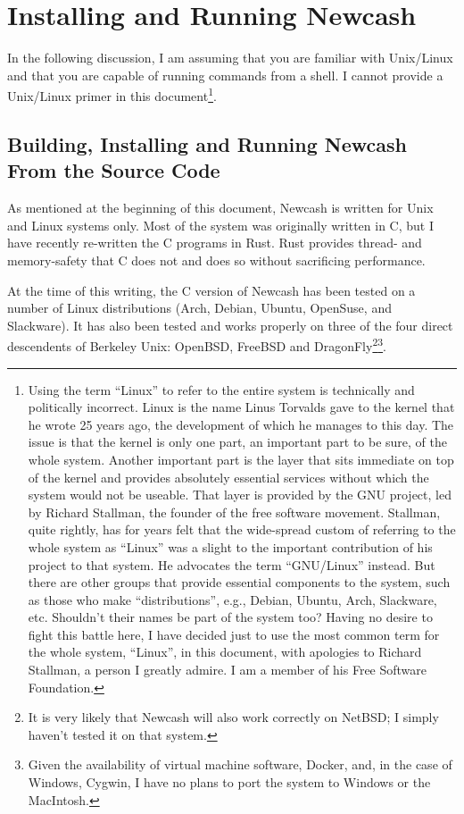 \documentclass{report}
\begin{document}
\chapter{Installing and Running Newcash}
In the following discussion, I am assuming that you are familiar with Unix/Linux and that you are capable of running commands from a shell. I cannot provide a Unix/Linux primer in this document\footnote{Using the term ``Linux'' to refer to the entire system is technically and politically incorrect. Linux is the name Linus Torvalds gave to the kernel that he wrote 25 years ago, the development of which he manages to this day. The issue is that the kernel is only one part, an important part to be sure, of the whole system. Another important part is the layer that sits immediate on top of the kernel and provides absolutely essential services without which the system would not be useable. That layer is provided by the GNU project, led by Richard Stallman, the founder of the free software movement. Stallman, quite rightly, has for years felt that the wide-spread custom of referring to the whole system as ``Linux'' was a slight to the important contribution of his project to that system. He advocates the term ``GNU/Linux'' instead. But there are other groups that provide essential components to the system, such as those who make ``distributions'', e.g., Debian, Ubuntu, Arch, Slackware, etc. Shouldn't their names be part of the system too? Having no desire to fight this battle here, I have decided just to use the most common term for the whole system, ``Linux'', in this document, with apologies to Richard Stallman, a person I greatly admire. I am a member of his Free Software Foundation.}.

\section{Building, Installing and Running Newcash From the Source Code}
\label{Building, Installing and Running Newcash From the Source Code}
As mentioned at the beginning of this document, Newcash is written for Unix and Linux systems only. Most of the system was originally written in C, but I have recently re-written the C programs in Rust. Rust provides thread- and memory-safety
that C does not and does so without sacrificing performance. 

At the time of this writing, the C version of Newcash has been tested on a number of Linux 
distributions (Arch, Debian, Ubuntu, OpenSuse, and Slackware). It has also been tested  and works properly on three of the four direct descendents of Berkeley Unix: 
OpenBSD, FreeBSD and DragonFly\footnote{It is very likely that Newcash will also work correctly on NetBSD; I simply haven't tested it on that system.}\footnote{Given the availability of virtual machine software, Docker, and, 
in the case of Windows, Cygwin, I have no plans to port the system to Windows or the MacIntosh.}.
\end{document}

